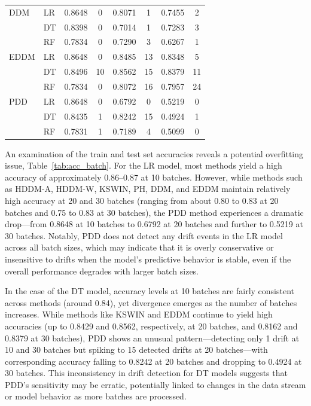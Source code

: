 \documentclass[pdflatex,sn-mathphys-ay]{sn-jnl}%
\theoremstyle{thmstyleone}%
\theoremstyle{thmstyletwo}%
\theoremstyle{thmstylethree}%
\begin{document}
\begin{table}[h]
\begin{tabular}{llcccccc}
       DDM    & LR & 0.8648 & 0 & 0.8071 & 1 & 0.7455 & 2 \\
              & DT & 0.8398 & 0 & 0.7014 & 1 & 0.7283 & 3 \\
              & RF & 0.7834 & 0 & 0.7290 & 3 & 0.6267 & 1 \\\midrule
       EDDM   & LR & 0.8648 & 0 & 0.8485 & 13 & 0.8348 & 5 \\
              & DT & 0.8496 & 10 & 0.8562 & 15 & 0.8379 & 11 \\
              & RF & 0.7834 & 0 & 0.8072 & 16 & 0.7957 & 24 \\\midrule
       PDD    & LR & 0.8648 & 0 & 0.6792 & 0 & 0.5219 & 0 \\
              & DT & 0.8435 & 1 & 0.8242 & 15 & 0.4924 & 1 \\
              & RF & 0.7831 & 1 & 0.7189 & 4 & 0.5099 & 0 \\\bottomrule
    \end{tabular}
\end{table}

An examination of the train and test set accuracies reveals a potential overfitting issue, Table~\ref{tab:acc_batch}. For the LR model, most methods yield a high accuracy of approximately 0.86–0.87 at 10 batches. However, while methods such as HDDM-A, HDDM-W, KSWIN, PH, DDM, and EDDM maintain relatively high accuracy at 20 and 30 batches (ranging from about 0.80 to 0.83 at 20 batches and 0.75 to 0.83 at 30 batches), the PDD method experiences a dramatic drop—from 0.8648 at 10 batches to 0.6792 at 20 batches and further to 0.5219 at 30 batches. Notably, PDD does not detect any drift events in the LR model across all batch sizes, which may indicate that it is overly conservative or insensitive to drifts when the model’s predictive behavior is stable, even if the overall performance degrades with larger batch sizes.

In the case of the DT model, accuracy levels at 10 batches are fairly consistent across methods (around 0.84), yet divergence emerges as the number of batches increases. While methods like KSWIN and EDDM continue to yield high accuracies (up to 0.8429 and 0.8562, respectively, at 20 batches, and 0.8162 and 0.8379 at 30 batches), PDD shows an unusual pattern—detecting only 1 drift at 10 and 30 batches but spiking to 15 detected drifts at 20 batches—with corresponding accuracy falling to 0.8242 at 20 batches and dropping to 0.4924 at 30 batches. This inconsistency in drift detection for DT models suggests that PDD’s sensitivity may be erratic, potentially linked to changes in the data stream or model behavior as more batches are processed.
\end{document}
